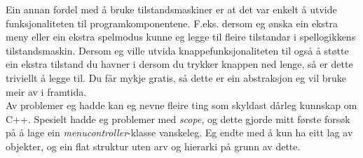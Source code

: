 \documentclass[journal]{IEEEtran}
\begin{document}
  Ein annan fordel med å bruke tilstandsmaskiner er at det var enkelt å utvide funksjonaliteten
  til programkomponentene. F.eks. dersom eg ønska ein ekstra meny eller ein ekstra spelmodus
  kunne eg legge til fleire tilstandar i spellogikkens tilstandsmaskin. Dersom eg ville
  utvida knappefunksjonaliteten til også å støtte ein ekstra tilstand du havner i
  dersom du trykker knappen ned lenge, så er dette triviellt å legge til. Du får mykje gratis,
  så dette er ein abstraksjon eg vil bruke meir av i framtida. \\


  Av problemer eg hadde kan eg nevne fleire ting som skyldast dårleg kunnskap om C++.
  Spesielt hadde eg problemer med \textit{scope}, og dette gjorde mitt første forsøk
  på å lage ein \textit{menucontroller}-klasse vanskeleg. Eg endte med å kun ha eitt lag av
  objekter, og ein flat struktur uten arv og hierarki på grunn av dette. \\
\end{document}
